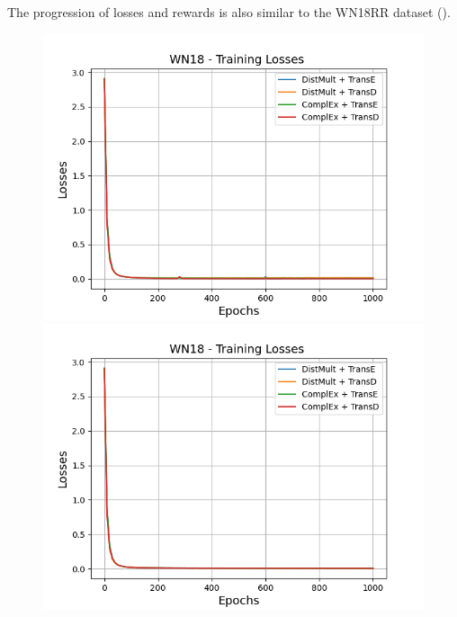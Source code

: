 The progression of losses and rewards is also similar to the \textsc{WN18RR} dataset ().
\begin{figure}[H]
    \centering
    \begin{minipage}{.5\textwidth}
      \centering
      \includegraphics[width=0.9\linewidth]{figures/results/gan_train/not_pretrained/uncertainty/max/entropy/wn18/1k_epochs/uncertainty_wn18_losses.png}
    \end{minipage}%
    \begin{minipage}{.5\textwidth}
      \centering
      \includegraphics[width=0.9\linewidth]{figures/results/gan_train/not_pretrained/uncertainty/max_distribution/entropy/wn18/1k_epochs/uncertainty_wn18_losses.png}
    \end{minipage}
    \begin{minipage}{.5\textwidth}

\end{minipage}
\end{figure}
